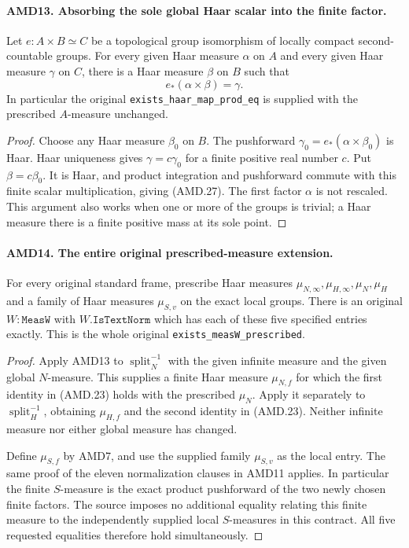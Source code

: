 \paragraph{AMD13. Absorbing the sole global Haar scalar into the finite factor.}
\label{claim:AMD13}
Let \(e:A\times B\simeq C\) be a topological group
isomorphism of locally compact second-countable groups.  For
every given Haar measure \(\alpha\) on \(A\) and every
given Haar measure \(\gamma\) on \(C\), there is a Haar
measure \(\beta\) on \(B\) such that
\[
                       e_*(\alpha\times\beta)=\gamma.
 \tag{AMD.27}
\]
In particular the original \texttt{exists\_haar\_map\_prod\_eq}
is supplied with the prescribed \(A\)-measure unchanged.

\begin{proof}
Choose any Haar measure \(\beta_0\) on \(B\).  The
pushforward \(\gamma_0=e_*(\alpha\times\beta_0)\) is Haar.
Haar uniqueness gives \(\gamma=c\gamma_0\) for a finite
positive real number \(c\).  Put \(\beta=c\beta_0\).
It is Haar, and product integration and pushforward commute
with this finite scalar multiplication, giving (AMD.27).
The first factor \(\alpha\) is not rescaled.  This argument
also works when one or more of the groups is trivial; a Haar
measure there is a finite positive mass at its sole point.
\end{proof}

\paragraph{AMD14. The entire original prescribed-measure extension.}
\label{claim:AMD14}
For every original standard frame, prescribe Haar measures
\(\mu_{N,\infty},\mu_{H,\infty},\mu_N,\mu_H\) and a
family of Haar measures \(\mu_{S,v}\) on the exact local
groups.  There is an original \(W:\texttt{MeasW}\) with
\(W.\texttt{IsTextNorm}\) which has each of these five
specified entries exactly.  This is the whole original
\texttt{exists\_measW\_prescribed}.

\begin{proof}
Apply AMD13 to \(\operatorname{split}_N^{-1}\) with the
given infinite measure and the given global \(N\)-measure.
This supplies a finite Haar measure \(\mu_{N,f}\) for which
the first identity in (AMD.23) holds with the prescribed
\(\mu_N\).  Apply it separately to
\(\operatorname{split}_H^{-1}\), obtaining \(\mu_{H,f}\)
and the second identity in (AMD.23).  Neither infinite measure
nor either global measure has changed.

Define \(\mu_{S,f}\) by AMD7, and use the supplied family
\(\mu_{S,v}\) as the local entry.  The same proof of the
eleven normalization clauses in AMD11 applies.  In particular
the finite \(S\)-measure is the exact product pushforward of
the two newly chosen finite factors.  The source imposes no
additional equality relating this finite measure to the
independently supplied local \(S\)-measures in this contract.
All five requested equalities therefore hold simultaneously.
\end{proof}

